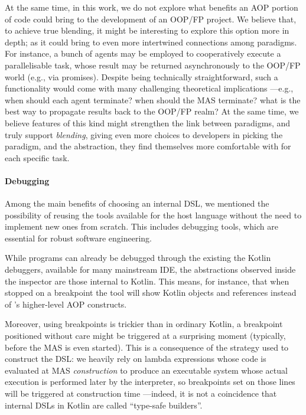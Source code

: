 At the same time,
in this work,
we do not explore what benefits an \ac{AOP} portion of code could bring
to the development of an \ac{OOP}/\ac{FP} project.
%
We believe that, to achieve true blending,
it might be interesting to explore this option more in depth;
as it could bring to even more intertwined connections among paradigms.
%
For instance,
a bunch of agents may be employed to cooperatively execute a parallelisable task,
whose result may be returned asynchronously to the \ac{OOP}/\ac{FP} world
(e.g., via promises).
%
Despite being technically straightforward,
such a functionality would come with many challenging theoretical implications%
---e.g., when should each agent terminate?
when should the \ac{MAS} terminate?
what is the best way to propagate results back to the \ac{OOP}/\ac{FP} realm?
%
At the same time,
we believe features of this kind might strengthen the link between paradigms,
and truly support \textit{blending}, giving even more choices
to developers in picking the paradigm, and the abstraction,
they find themselves more comfortable with for each specific task.

\paragraph{Debugging}

Among the main benefits of choosing an internal \ac{DSL},
we mentioned the possibility of reusing the tools
available for the host language without the need to implement
new ones from scratch.
%
This includes debugging tools,
which are essential for robust software engineering.

While \jakta{} programs can already be debugged through the existing the Kotlin debuggers,
available for many mainstream \ac{IDE},
the abstractions observed inside the inspector are those internal to Kotlin.
%
This means, for instance,
that when stopped on a breakpoint the tool will show Kotlin objects and references
instead of \jakta{}'s higher-level \ac{AOP} constructs.

Moreover, using breakpoints is trickier than in ordinary Kotlin,
a breakpoint positioned without care might be triggered at a surprising moment
(typically, before the \ac{MAS} is even started).
%
This is a consequence of the strategy used to construct the \ac{DSL}:
we heavily rely on lambda expressions
whose code is evaluated at \ac{MAS} \emph{construction}
to produce an executable system whose actual execution is performed later by the interpreter,
so breakpoints set on those lines will be triggered at construction time%
---indeed, it is not a coincidence that internal \acp{DSL} in Kotlin are
called ``type-safe builders''.

